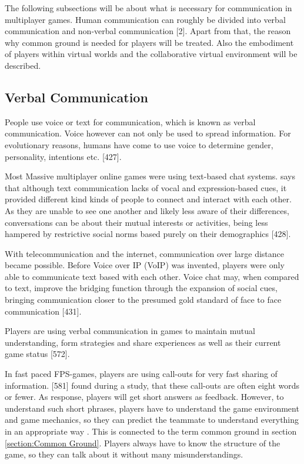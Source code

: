 The following subsections will be about what is necessary for communication in multiplayer games.
Human communication can roughly be divided into verbal communication and non-verbal communication \autocite{Kujanpaa2003SupportingAvatars}[2]. 
Apart from that, the reason why common ground is needed for players will be treated. Also the embodiment of players within virtual worlds and the collaborative virtual environment will be described.



\subsection{Verbal Communication}
\label{section:Verbal Communication}

People use voice or text for communication, which is known as verbal communication.
Voice however can not only be used to spread information.
For evolutionary reasons, humans have come to use voice to determine gender, personality, intentions etc. \autocite{Williams2007CanCommunity}[427].

Most Massive multiplayer online games were using text-based chat systems.
\textcite{Williams2007CanCommunity} says that although text communication lacks of vocal and expression-based cues, it provided different kind kinds of people to connect and interact with each other. As they are unable to see one another and likely less aware of their differences, conversations can be about their mutual interests or activities, being less hampered by restrictive social norms based purely on their demographics \autocite{Williams2007CanCommunity}[428].

With telecommunication and the internet, communication over large distance became possible. Before Voice over IP (VoIP) was invented, players were only able to communicate text based with each other. Voice chat may, when compared to text, improve the bridging function through the expansion of social cues, bringing communication closer to the presumed gold standard of face to face communication \autocite{Williams2007CanCommunity}[431].

Players are using verbal communication in games to maintain mutual understanding, form strategies and share experiences as well as their current game status \autocite{Cheung2012CommunicationGaming}[572].

In fast paced FPS-games, players are using call-outs for very fast sharing of information. \textcite{Tang2012VerbalGames}[581] found during a study, that these call-outs are often eight words or fewer. As response, players will get short answers as feedback.
However, to understand such short phrases, players have to understand the game environment and game mechanics, so they can predict the teammate to understand everything in an appropriate way \autocite{Tang2012VerbalGames}. This is connected to the term common ground in section \ref{section:Common Ground}. Players always have to know the structure of the game, so they can talk about it without many misunderstandings.

